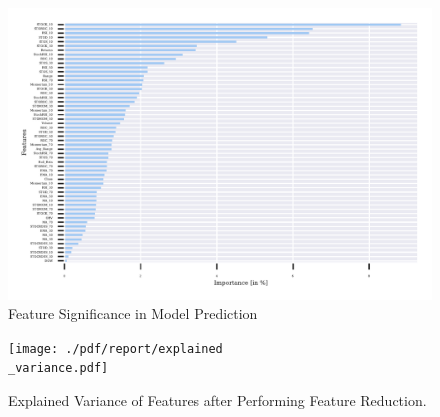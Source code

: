 \begin{figure}
\centering
\begin{adjustbox}{max width=1.2\textwidth,center}
\includegraphics[scale=1.2]{./pdf/report/feature_importance.pdf}
\end{adjustbox}
\caption{Feature Significance in Model Prediction}
\label{fig:feature_importance}
\end{figure}



\begin{figure}[h]
\centering
\texttt{[image: ./pdf/report/explained\\\_variance.pdf]}
\caption{Explained Variance of Features after Performing Feature Reduction.}
\label{fig:explained_variance}
\end{figure}
